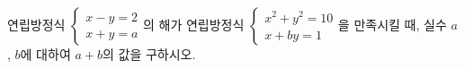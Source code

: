 연립방정식 $\begin{cases} x-y=2 \\ x+y=a \end{cases}$의 해가 연립방정식 $\begin{cases} x^2+y^2=10 \\ x+by=1 \end{cases}$을 만족시킬 때, 실수 $a$, $b$에 대하여 $a+b$의 값을 구하시오. 
